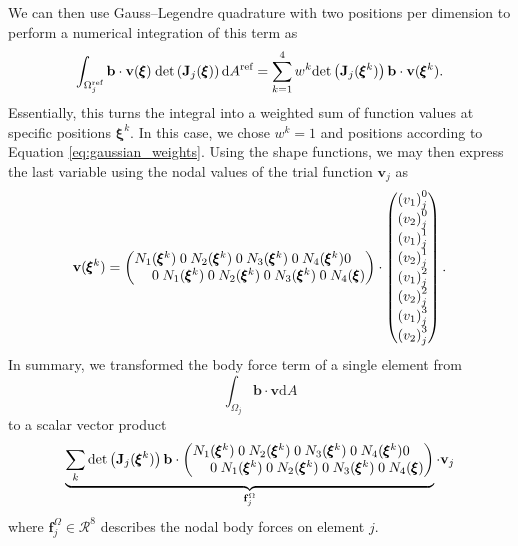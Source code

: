 We can then use Gauss–Legendre quadrature with two positions per dimension to perform a numerical integration of this term as
\begin{equation}
    \int_{\Omega_j^\textrm{ref}} \mathbf{b} \cdot \mathbf{v}(\pmb{\xi}) \hspace{0.25em}\text{det}\left(\mathbf{J}_j(\pmb{\xi})\right)\text{d}A^\textrm{ref}
    = \sum_{k=1}^4 w^k \text{det}\left(\mathbf{J}_j(\pmb{\xi}^k)\right) \mathbf{b} \cdot \mathbf{v}(\pmb{\xi}^k).
\end{equation}
Essentially, this turns the integral into a weighted sum of function values at specific positions $\pmb{\xi}^k$. In this case, we chose $w^k=1$ and positions according to Equation \eqref{eq:gaussian_weights}.
Using the shape functions, we may then express the last variable using the nodal values of the trial function $\mathbf{v}_j$ as  
\begin{equation}
    \mathbf{v}(\pmb{\xi}^k) 
    =
    \begingroup 
    \setlength\arraycolsep{-5pt}
    \begin{pmatrix}
            N_1(\pmb{\xi}^k) & 0 & N_2(\pmb{\xi}^k) & 0 & N_3(\pmb{\xi}^k) & 0 & N_4(\pmb{\xi}^k) & 0\\
            0 & N_1(\pmb{\xi}^k) & 0 & N_2(\pmb{\xi}^k) & 0 & N_3(\pmb{\xi}^k) & 0 & N_4(\pmb{\xi})\\
    \end{pmatrix} 
    \endgroup
    \cdot 
    \begin{pmatrix}
            {(v_1)}_j^0 \\
            {(v_2)}_j^0 \\
            {(v_1)}_j^1 \\
            {(v_2)}_j^1 \\
            {(v_1)}_j^2 \\
            {(v_2)}_j^2 \\
            {(v_1)}_j^3 \\
            {(v_2)}_j^3 
    \end{pmatrix}.
    \label{eq:shape_interpolation}
\end{equation}
In summary, we transformed the body force term of a single element from 
\begin{equation}
    \int_{\Omega_j} \mathbf{b} \cdot \mathbf{v} \text{d}A  
\end{equation}
to a scalar vector product 
\begin{equation}
    \underbrace{\sum_k \text{det}\left(\mathbf{J}_j(\pmb{\xi}^k)\right) \mathbf{b} \cdot \begingroup 
    \setlength\arraycolsep{-5pt}
    \begin{pmatrix}
            N_1(\pmb{\xi}^k) & 0 & N_2(\pmb{\xi}^k) & 0 & N_3(\pmb{\xi}^k) & 0 & N_4(\pmb{\xi}^k) & 0\\
            0 & N_1(\pmb{\xi}^k) & 0 & N_2(\pmb{\xi}^k) & 0 & N_3(\pmb{\xi}^k) & 0 & N_4(\pmb{\xi})\\
    \end{pmatrix} 
    \endgroup}_{\mathbf{f}^\Omega_j}
    \cdot 
    \mathbf{v}_j
\end{equation}
where $\mathbf{f}^\Omega_j \in \mathcal{R}^8$ describes the nodal body forces on element $j$. 

